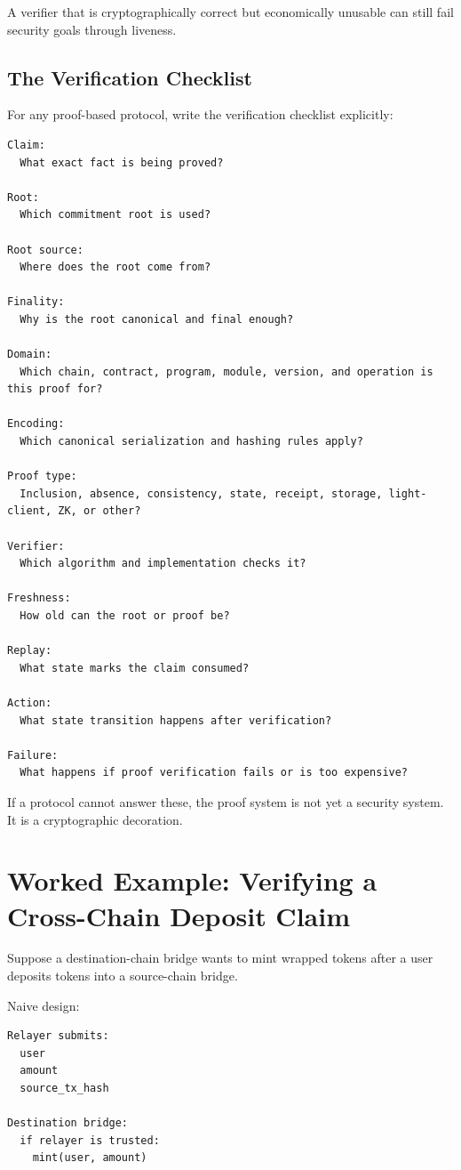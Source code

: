 A verifier that is cryptographically correct but economically unusable
can still fail security goals through liveness.

\subsection{The Verification Checklist}

For any proof-based protocol, write the verification checklist
explicitly:

\begin{lstlisting}
Claim:
  What exact fact is being proved?

Root:
  Which commitment root is used?

Root source:
  Where does the root come from?

Finality:
  Why is the root canonical and final enough?

Domain:
  Which chain, contract, program, module, version, and operation is this proof for?

Encoding:
  Which canonical serialization and hashing rules apply?

Proof type:
  Inclusion, absence, consistency, state, receipt, storage, light-client, ZK, or other?

Verifier:
  Which algorithm and implementation checks it?

Freshness:
  How old can the root or proof be?

Replay:
  What state marks the claim consumed?

Action:
  What state transition happens after verification?

Failure:
  What happens if proof verification fails or is too expensive?
\end{lstlisting}

If a protocol cannot answer these, the proof system is not yet a
security system. It is a cryptographic decoration.

\section{Worked Example: Verifying a Cross-Chain Deposit Claim}

Suppose a destination-chain bridge wants to mint wrapped tokens after a
user deposits tokens into a source-chain bridge.

Naive design:

\begin{lstlisting}
Relayer submits:
  user
  amount
  source_tx_hash

Destination bridge:
  if relayer is trusted:
    mint(user, amount)
\end{lstlisting}

